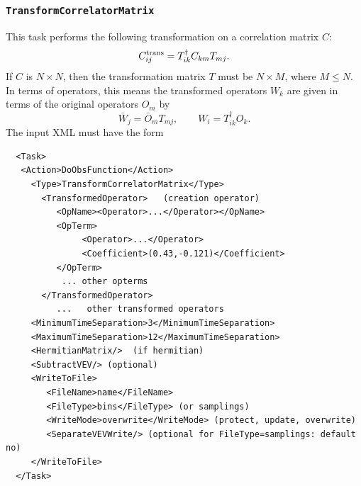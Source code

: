 \documentclass[12pt]{article}
\newcommand{\vb}{\texttt}
\begin{document}
\subsubsection{\vb{TransformCorrelatorMatrix}}
This task performs the following transformation on a correlation matrix $C$:
\[
  C^{\rm trans}_{ij} = T^\dagger_{ik} C_{km} T_{mj}.
\]
If $C$ is $N\times N$, then the transformation matrix $T$ must be 
$N\times M$, where $M \leq N$.  In terms of operators, this means the 
transformed operators $W_k$ are given in terms of the original operators
$O_m$ by
\[   \bar{W}_j = \bar{O}_m T_{mj},\qquad 
                   W_i = T^\dagger_{ik} O_k.
\]
The input XML must have the form
\begin{verbatim}
  <Task>
   <Action>DoObsFunction</Action>
     <Type>TransformCorrelatorMatrix</Type>              
       <TransformedOperator>   (creation operator)       
          <OpName><Operator>...</Operator></OpName>      
          <OpTerm>                                       
               <Operator>...</Operator>                  
               <Coefficient>(0.43,-0.121)</Coefficient>  
          </OpTerm>                                      
           ... other opterms                             
       </TransformedOperator>                            
          ...   other transformed operators              
     <MinimumTimeSeparation>3</MinimumTimeSeparation>    
     <MaximumTimeSeparation>12</MaximumTimeSeparation>   
     <HermitianMatrix/>  (if hermitian)                  
     <SubtractVEV/> (optional)                           
     <WriteToFile>                                       
        <FileName>name</FileName>                        
        <FileType>bins</FileType> (or samplings)         
        <WriteMode>overwrite</WriteMode> (protect, update, overwrite)    
        <SeparateVEVWrite/> (optional for FileType=samplings: default no)
     </WriteToFile> 
  </Task>
\end{verbatim}
\end{document}
